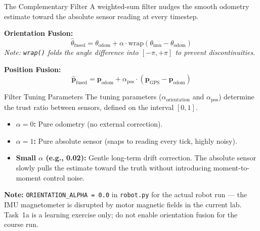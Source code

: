 \documentclass{beamer}
\begin{document}
\begin{frame}{The Complementary Filter}
    A weighted-sum filter nudges the smooth odometry estimate toward the absolute sensor reading at every timestep.
    \vspace{0.5cm}
    
    \textbf{Orientation Fusion:}
    \begin{equation*}
        \hat{\theta}_{\text{fused}} = \theta_{\text{odom}} + \alpha \cdot \text{wrap}(\theta_{\text{imu}} - \theta_{\text{odom}})
    \end{equation*}
    \textit{Note: \texttt{wrap()} folds the angle difference into $[-\pi, +\pi]$ to prevent discontinuities.}
    
    \vspace{0.5cm}
    \textbf{Position Fusion:}
    \begin{equation*}
        \hat{\mathbf{p}}_{\text{fused}} = \mathbf{p}_{\text{odom}} + \alpha_{\text{pos}} \cdot (\mathbf{p}_{\text{GPS}} - \mathbf{p}_{\text{odom}})
    \end{equation*}
\end{frame}

\begin{frame}{Filter Tuning Parameters}
    The tuning parameters ($\alpha_{\text{orientation}}$ and $\alpha_{\text{pos}}$) determine the trust ratio between sensors, defined on the interval $[0,1]$.

    \vspace{0.3cm}
    \begin{itemize}
        \item \textbf{$\alpha = 0$:} Pure odometry (no external correction).
        \item \textbf{$\alpha = 1$:} Pure absolute sensor (snaps to reading every tick, highly noisy).
        \item \textbf{Small $\alpha$ (e.g., 0.02):} Gentle long-term drift correction. The absolute sensor slowly pulls the estimate toward the truth without introducing moment-to-moment control noise.
    \end{itemize}

    \vspace{0.3cm}
    \textbf{Note:} \texttt{ORIENTATION\_ALPHA = 0.0} in \texttt{robot.py} for the actual robot run --- the IMU magnetometer is disrupted by motor magnetic fields in the current lab.  Task~1a is a learning exercise only; do not enable orientation fusion for the course run.
\end{frame}
\end{document}
